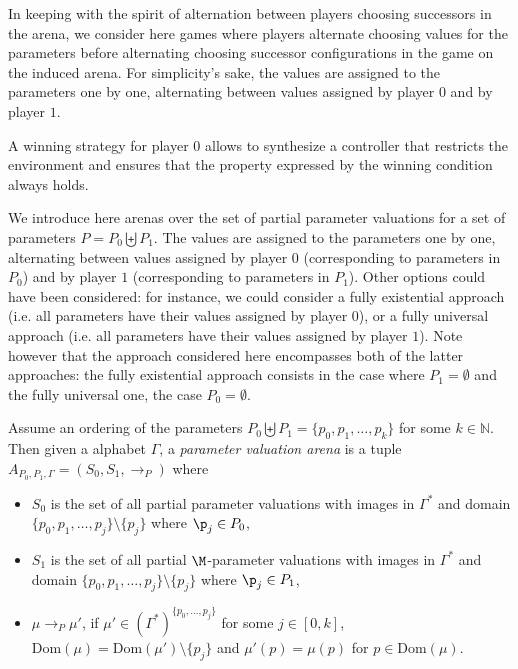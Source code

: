 \documentclass[a4paper,UKenglish,cleveref, autoref, thm-restate]{lipics-v2021}
\newcommand{\N}{\mathbb{N}}
\begin{document}
In keeping with the spirit of alternation between players choosing successors in the arena, we consider here games where players
alternate choosing values for the parameters before alternating choosing successor configurations in the game on the induced arena.
For simplicity's sake, the values are assigned to the parameters one by one, alternating between values assigned by player $0$ and by player $1$.

A winning strategy for player $0$ allows to synthesize a controller that restricts the environment and ensures that {the property expressed by the winning condition always holds.}


We introduce here arenas over the set of partial parameter valuations for a set of parameters
$P = P_0 \biguplus P_1$. The values are assigned to the parameters one by one, alternating between values assigned by player $0$ (corresponding to parameters in $P_0$) and by player $1$ (corresponding to parameters in $P_1$). Other options could have been considered: for instance, we could consider a fully existential approach 
(i.e. all parameters have their values assigned by player $0$), 
or a fully universal approach
(i.e. all parameters have their values assigned by player $1$). 
Note however that the approach considered here encompasses both of the latter approaches:
the fully existential approach consists in the case where $P_1 = \emptyset$ and
the fully universal one, the case $P_0 = \emptyset$.



Assume an ordering of the parameters $P_0 \biguplus P_1 = \{p_0, p_1, \ldots, p_k \}$ for some 
 $k \in \N$.
%
Then given a alphabet $\Gamma$, a {\em parameter valuation arena} is a tuple $A_{P_0,P_1,\Gamma} = (S_0, S_1, \rightarrow_P)$ where
\begin{itemize}

\item $S_0$ is the set of all partial parameter valuations with images in $\Gamma^*$ and domain $\{p_0, p_1, \ldots, p_{j}\} \setminus \{p_j\}$ where $\p_j \in P_0$,

\item $S_1$ is the set of all partial $\M$-parameter valuations  with images in $\Gamma^*$ and  domain $\{p_0, p_1, \ldots, p_{j}\} \setminus \{p_j\}$ where $\p_j \in P_1$,

\item
$ \mu \rightarrow_P \mu'$,
if $\mu' \in (\Gamma^*)^{\{p_0, \ldots, p_j\}}$ for some $j \in [0,k]$,
$\text{Dom}(\mu) = \text{Dom}(\mu') \setminus \{p_j\}$
and
 $\mu'(p) = \mu(p)$ for $p \in \text{Dom}(\mu)$. \label{parametric arena}
\end{itemize}
\end{document}
